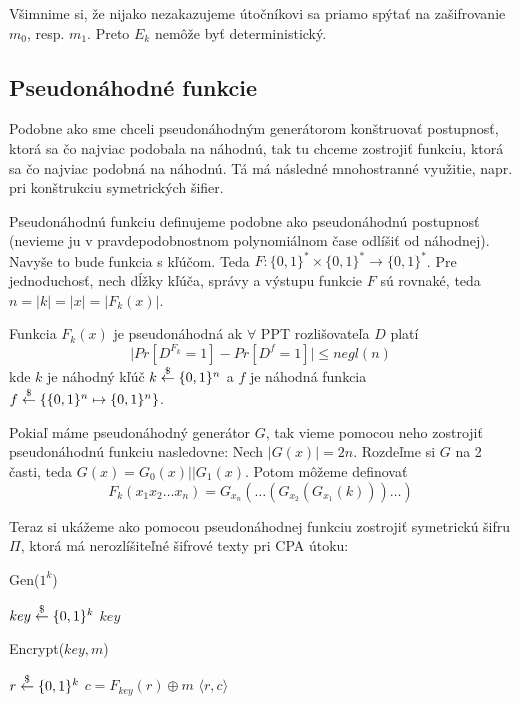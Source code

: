 Všimnime si, že nijako nezakazujeme útočníkovi sa priamo spýtať na zašifrovanie $m_0$, resp. $m_1$. 
Preto $E_k$ nemôže byť deterministický. 

\subsection{Pseudonáhodné funkcie}

Podobne ako sme chceli pseudonáhodným generátorom konštruovať
postupnosť, ktorá sa čo najviac podobala na náhodnú, tak tu
chceme zostrojiť funkciu, ktorá sa čo najviac podobná na náhodnú. 
Tá má následné mnohostranné využitie, napr. pri konštrukciu symetrických šifier.

Pseudonáhodnú funkciu definujeme podobne ako pseudonáhodnú postupnosť 
(nevieme ju v pravdepodobnostnom polynomiálnom čase odlíšiť od náhodnej). 
Navyše to bude funkcia s kľúčom. 
Teda $F: \{0,1\}^* \times \{0,1\}^* \to \{0,1\}^*$. 
Pre jednoduchosť, nech dĺžky
kľúča, správy a výstupu funkcie $F$ sú rovnaké, teda $n = |k| = |x| = |F_k(x)|$.

\begin{definicia}
    Funkcia $F_k(x)$ je pseudonáhodná ak $\forall$ PPT rozlišovateľa 
        $D$ platí
    \begin{equation*}
        \Big| Pr[D^{F_k} = 1] - Pr[D^f = 1] \Big| \leq negl(n)
    \end{equation*}
    kde $k$ je náhodný kľúč $k \overset{\$}{\leftarrow} \{0,1\}^n$ a 
    $f$ je náhodná funkcia $f \overset{\$}{\leftarrow} \{ \{0,1\}^n \mapsto \{0,1\}^n\}$.
\end{definicia}

Pokiaľ máme pseudonáhodný generátor $G$,
tak vieme pomocou neho zostrojiť pseudonáhodnú funkciu nasledovne:
Nech $|G(x)|=2n$. Rozdeľme si $G$ na 2 časti, teda $G(x) = G_0(x)||G_1(x)$.
Potom môžeme definovať
\begin{equation*}
    F_k(x_1 x_2 \dots x_n) = G_{x_n}(\dots(G_{x_2}(G_{x_1}(k)))\dots)
\end{equation*}

Teraz si ukážeme ako pomocou pseudonáhodnej funkciu zostrojiť symetrickú šifru $\Pi$, ktorá má nerozlíšiteľné
šifrové texty pri CPA útoku:

\begin{procedure}[h!]
    \caption{Gen($1^k$)}
    $key \overset{\$}{\leftarrow} \{0,1\}^k$\;
    \Return $key$\;
\end{procedure}

\begin{procedure}[h!]
    \caption{Encrypt($key,m$)}
    $r \overset{\$}{\leftarrow} \{0,1\}^k$\;
    $c = F_{key}(r) \oplus m$\;
    \Return $\langle r,c \rangle$\;
\end{procedure}


